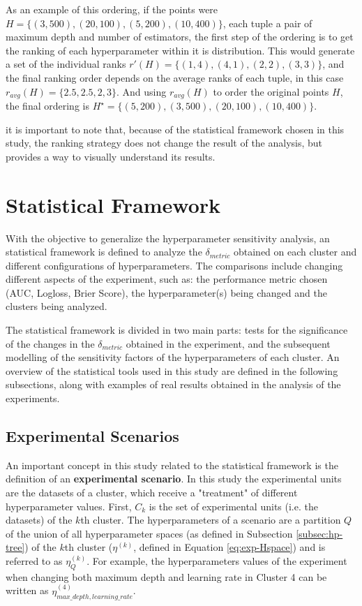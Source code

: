 As an example of this ordering, if the points were $H = \{(3, 500), (20, 100), (5, 200), (10, 400)\}$, each tuple a 
pair of maximum depth and number of estimators, the first step of the ordering is to get the ranking of each hyperparameter within it is distribution. This would generate a set of the individual ranks $r'(H) = \{(1, 4), (4, 1), (2, 2), (3, 3)\}$, and the final ranking order depends on the average ranks of each tuple, in this case $r_{avg}(H) = \{2.5, 2.5, 2, 3\}$. And using $r_{avg}(H)$ to order the original points $H$, the final ordering is $H^\star = \{(5, 200), (3, 500), (20, 100), (10, 400)\}$.

it is important to note that, because of the statistical framework chosen in this study, the ranking strategy does not change the result of the analysis, but provides a way to visually understand its results.

\section{Statistical Framework}

With the objective to generalize the hyperparameter sensitivity analysis, an statistical framework is defined to analyze the $\delta_{metric}$ obtained on each cluster and different configurations of hyperparameters. The comparisons include changing different aspects of the experiment, such as: the performance metric chosen (AUC, Logloss, Brier Score), the hyperparameter(s) being changed and the clusters being analyzed.

The statistical framework is divided in two main parts: tests for the significance of the changes in the $\delta_{metric}$ obtained in the experiment, and the subsequent modelling of the sensitivity factors of the hyperparameters of each cluster. An overview of the statistical tools used in this study are defined in the following subsections, along with examples of real results obtained in the analysis of the experiments.

\subsection{Experimental Scenarios}

An important concept in this study related to the statistical framework is the definition of an \textbf{experimental scenario}. In this study the experimental units are the datasets of a cluster, which receive a "treatment" of different hyperparameter values. First, $C_k$ is the set of experimental units (i.e. the datasets) of the $k$th cluster. The hyperparameters of a scenario are a partition $Q$ of the union of all hyperparameter spaces (as defined in Subsection \ref{subsec:hp-tree}) of the $k$th cluster ($\eta^{(k)}$, defined in Equation \ref{eq:exp-Hspace}) and is referred to as  $\eta^{(k)}_Q$. For example, the hyperparameters values of the experiment when changing both maximum depth and learning rate in Cluster 4 can be written as $\eta^{(4)}_{max\_depth, learning\_rate}$.

